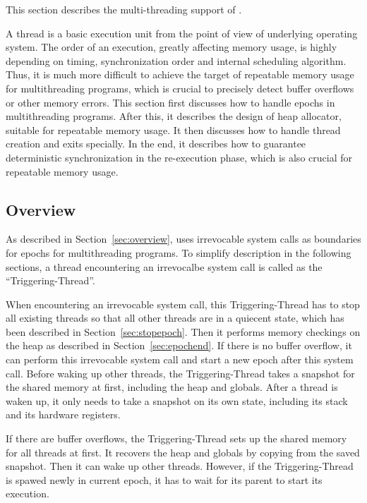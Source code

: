 \label{sec:multithreading}

This section describes the multi-threading support of \doubletake{}.

A thread is a basic execution unit from the point of view of underlying operating system. 
The order of an execution, greatly affecting memory usage, 
is highly depending on timing, synchronization order and internal scheduling algorithm.   
Thus, it is much more difficult to achieve the target of repeatable memory 
usage for multithreading programs, which is crucial to 
precisely detect buffer overflows or other memory errors.
This section first discusses how to handle epochs in multithreading programs.
After this, it describes the design of heap allocator, suitable for repeatable memory usage.
It then discusses how to handle thread creation and exits specially. 
In the end, it describes how to guarantee deterministic synchronization in the re-execution phase,
which is also crucial for repeatable memory usage.


\subsection{Overview}
\label{sec:mtoverview}

As described in Section~\ref{sec:overview}, \doubletake{} uses irrevocable system calls as 
boundaries for epochs for multithreading programs. 
To simplify description in the following sections, a thread encountering an irrevocalbe system call is 
called as the ``Triggering-Thread''. 

When encountering an irrevocable system call, this Triggering-Thread 
has to stop all existing threads so that all other threads are in a quiecent state, which
has been described in Section~\ref{sec:stopepoch}.
Then it performs memory checkings on the heap as described in Section~\ref{sec:epochend}. 
If there is no buffer overflow, it can perform this irrevocable system call and 
start a new epoch after this system call. 
Before waking up other threads, the Triggering-Thread takes a snapshot for the shared memory at first,
including the heap and globals. 
After a thread is waken up, it only needs to take a snapshot on its own state, 
including its stack and its hardware registers. 

If there are buffer overflows, the Triggering-Thread sets up the shared memory 
for all threads at first.
It recovers the heap and globals by copying from the saved snapshot. 
Then it can wake up other threads. 
However, if the Triggering-Thread is spawed newly in current epoch, 
it has to wait for its parent to start its execution. 

